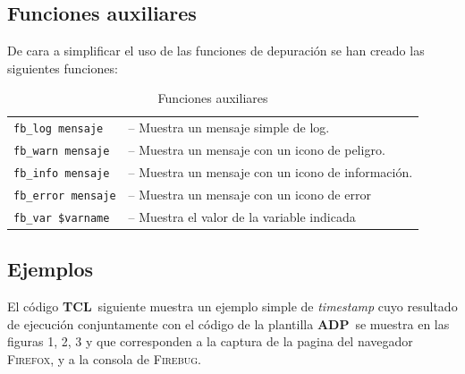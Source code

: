\documentclass{tufte-handout}
\newcommand{\Firebug}{\textsc{Firebug}}%
\newcommand{\Firefox}{\textsc{Firefox}}%
\newcommand{\TCL}{\textbf{TCL}}%
\newcommand{\ADP}{\textbf{ADP}}%
\begin{document}
\subsection{Funciones auxiliares}

De cara a simplificar el uso de las funciones de depuración se han creado las siguientes funciones:
\begin{table}[ht]
  \selectfont
  \begin{tabularx}{\textwidth}{lX}
	\texttt{fb\_log   mensaje} &– Muestra un mensaje simple de log.\\
\texttt{fb\_warn  mensaje} &– Muestra un mensaje con un icono de peligro. \\
\texttt{fb\_info  mensaje} &– Muestra un mensaje con un icono de información. \\
\texttt{fb\_error mensaje} &– Muestra un mensaje con un icono de error \\
\texttt{fb\_var  \$varname} &– Muestra el valor de la variable indicada \\
  \end{tabularx}
  \caption{Funciones auxiliares}
  \label{tab:auxfuncs}
\end{table}

\newpage
\subsection{Ejemplos}
El código \TCL\ siguiente muestra un ejemplo simple de \mbox{\it timestamp} cuyo resultado de ejecución conjuntamente con el código de la plantilla \ADP\ se muestra en las figuras 1, 2, 3 y que corresponden a la captura de la pagina del navegador \Firefox, y a la consola de \Firebug.
\end{document}
